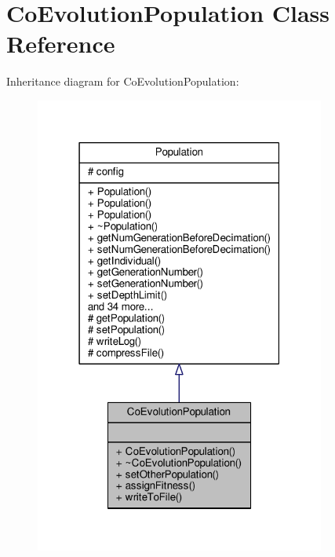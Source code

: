\hypertarget{classCoEvolutionPopulation}{}\section{Co\+Evolution\+Population Class Reference}
\label{classCoEvolutionPopulation}


Inheritance diagram for Co\+Evolution\+Population\+:
\nopagebreak
\begin{figure}[H]
\begin{center}
\leavevmode
\includegraphics[width=271pt]{classCoEvolutionPopulation__inherit__graph}
\end{center}
\end{figure}


